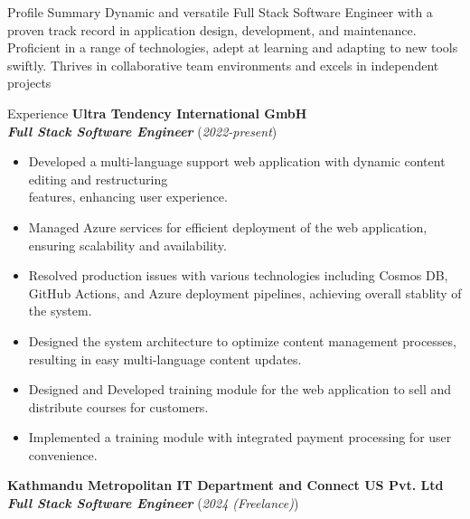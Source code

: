 \documentclass{resume} %
\begin{document}
\begin{rSection}{Profile Summary}
    Dynamic and versatile Full Stack Software Engineer with a proven track record in application design, development, and maintenance. Proficient in a range of technologies, adept at learning and adapting to new tools swiftly. Thrives in collaborative team environments and excels in independent projects
\end{rSection}

\begin{rSection}{Experience}
    \large{{\bf Ultra Tendency International GmbH}}
    \\ \small{\textit{\textbf{Full Stack Software Engineer}}} (\small{\textit{2022-present}})

    \begin{itemize}
        \item Developed a multi-language support web application with dynamic content editing and restructuring \\ features, enhancing user experience.
        \item Managed Azure services for efficient deployment of the web application, ensuring scalability and availability.
        \item Resolved production issues with various technologies including Cosmos DB, GitHub Actions, and Azure deployment pipelines, achieving overall stablity of the system.
        \item Designed the system architecture to optimize content management processes, resulting in easy multi-language content updates.
        \item Designed and Developed training module for the web application to sell and distribute courses for customers.
        \item Implemented a training module with integrated payment processing for user convenience.
    \end{itemize}

    \large{{\bf Kathmandu Metropolitan IT Department and Connect US Pvt. Ltd}}
    \\ \small{\textit{\textbf{Full Stack Software Engineer}}} (\small{\textit{2024 (Freelance)}})


\end{rSection}
\end{document}
